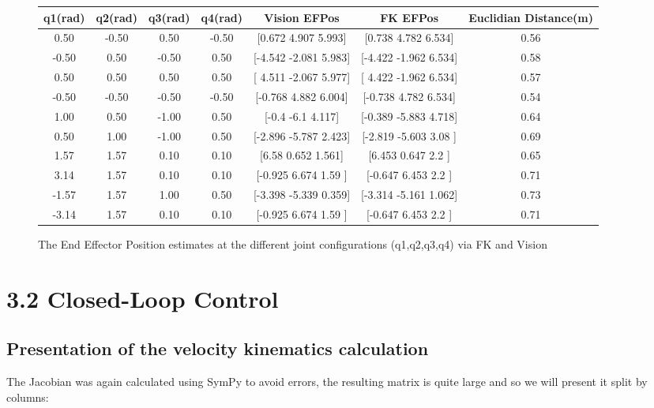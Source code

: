 \documentclass[11pt]{report}
\begin{document}
\begin{figure}[h]

    \begin{center}
        \begin{tabular}{|c|c|c|c|c|c|c|}
        \hline 
         q1(rad)&q2(rad)&q3(rad)&q4(rad)&Vision EFPos &FK EFPos& Euclidian Distance(m) \\ \hline 
        0.50&-0.50&0.50&-0.50&[0.672 4.907 5.993]&[0.738 4.782 6.534]&0.56 \\ \hline 
        -0.50&0.50&-0.50&0.50&[-4.542 -2.081  5.983]&[-4.422 -1.962  6.534]&0.58 \\ \hline 
        0.50&0.50&0.50&0.50&[ 4.511 -2.067  5.977]&[ 4.422 -1.962  6.534]&0.57 \\ \hline 
        -0.50&-0.50&-0.50&-0.50&[-0.768  4.882  6.004]&[-0.738  4.782  6.534]&0.54 \\ \hline 
        1.00&0.50&-1.00&0.50&[-0.4   -6.1    4.117]&[-0.389 -5.883  4.718]&0.64 \\ \hline 
        0.50&1.00&-1.00&0.50&[-2.896 -5.787  2.423]&[-2.819 -5.603  3.08 ]&0.69 \\ \hline 
        1.57&1.57&0.10&0.10&[6.58  0.652 1.561]&[6.453 0.647 2.2  ]&0.65 \\ \hline 
        3.14&1.57&0.10&0.10&[-0.925  6.674  1.59 ]&[-0.647  6.453  2.2  ]&0.71 \\ \hline 
        -1.57&1.57&1.00&0.50&[-3.398 -5.339  0.359]&[-3.314 -5.161  1.062]&0.73 \\ \hline 
        -3.14&1.57&0.10&0.10&[-0.925  6.674  1.59 ]&[-0.647  6.453  2.2  ]&0.71 \\ \hline 
        \end{tabular}
    \end{center}
    \caption{The End Effector Position estimates at the different joint configurations (q1,q2,q3,q4) via FK and Vision}

\end{figure}


\section*{3.2 Closed-Loop Control}
\subsection*{Presentation of the velocity kinematics calculation}
The Jacobian was again calculated using SymPy to avoid errors, the resulting matrix is quite large and so we will present it split by columns:
\end{document}
